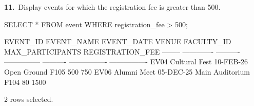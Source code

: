 \noindent\begin{minipage}{\linewidth}
\begingroup{}
{\fontsize{14}{17}\selectfont\textbf{11.}}\ Display events for which the registration fee is greater than 500.\par
\endgroup\vspace{12pt}


\begin{sqlcode}
SELECT * FROM event WHERE registration_fee > 500;
\end{sqlcode}

\vspace{18pt}


\begin{sqlout}[fontsize=\scriptsize]
EVENT_ID  EVENT_NAME     EVENT_DATE  VENUE            FACULTY_ID  MAX_PARTICIPANTS  REGISTRATION_FEE
--------  -------------  ----------  ---------------  ----------  ----------------  ----------------
EV04      Cultural Fest  10-FEB-26   Open Ground      F105                     500               750
EV06      Alumni Meet    05-DEC-25   Main Auditorium  F104                      80              1500

2 rows selected.
\end{sqlout}
\end{minipage}\par\vspace{24pt}


